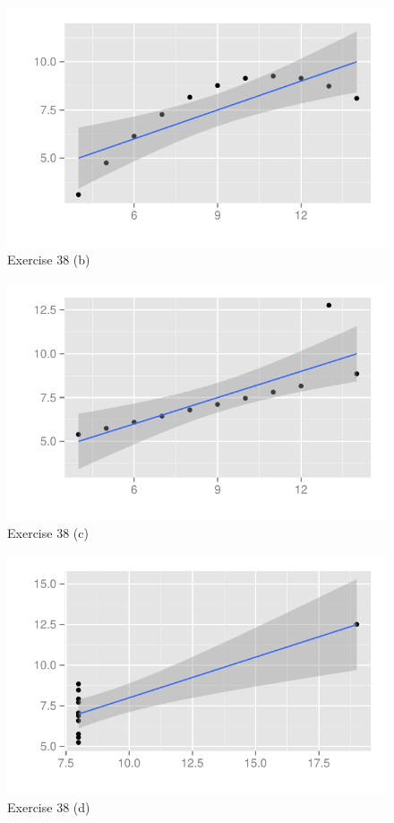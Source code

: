\documentclass[letterpaper, landscape]{exam}
\begin{document}
\begin{description}
        \begin{figure}[H]
          \centering
          \includegraphics[scale = 0.9]{figures/ex38b.pdf}
          \caption{Exercise 38 (b)}\label{fig:38b}
        \end{figure}

        \begin{figure}[H]
          \centering
          \includegraphics[scale = 0.9]{figures/ex38c.pdf}
          \caption{Exercise 38 (c)}\label{fig:38c}
        \end{figure}

        \begin{figure}[H]
          \centering
          \includegraphics[scale = 0.9]{figures/ex38d.pdf}
          \caption{Exercise 38 (d)}\label{fig:38d}
        \end{figure}


\end{description}
\end{document}
